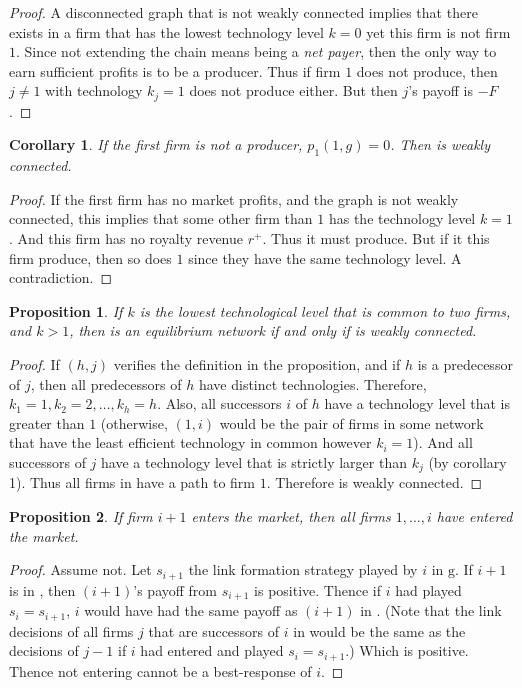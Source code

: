 \documentclass{article}
\newtheorem{corollary}{Corollary}
\newtheorem{proposition}{Proposition}
\begin{document}
\begin{proof}
A disconnected graph that is not weakly connected implies that there exists in  a firm that has the lowest technology level $k=0$ yet this firm is not firm $1$. Since not extending the chain means being a \textit{net payer}, then the only way to earn sufficient profits is to be a producer. Thus if firm $1$ does not produce, then $j\neq 1$ with technology $k_j=1$ does not produce either. But then $j$'s payoff is $-F$. 
\end{proof}

\begin{corollary}
If the first firm is not a producer, $p_1(1,g)=0$. Then  is weakly connected.
\end{corollary}

\begin{proof}
If the first firm has no market profits, and the graph is not weakly connected, this implies that some other firm than $1$ has the technology level $k=1$. And this firm has no royalty revenue $r^+$. Thus it must produce. But if it this firm produce, then so does $1$ since they have the same technology level. A contradiction.  
\end{proof}

\begin{proposition}
If $k$ is the lowest technological level that is common to two firms, and $k>1$, then  is an equilibrium network if and only if  is weakly connected. 
\end{proposition} 
\begin{proof}
If $(h,j)$ verifies the definition in the proposition, and if $h$ is a predecessor of $j$, then all predecessors of $h$ have distinct technologies. Therefore, $k_1=1, k_2=2,\ldots, k_h=h$. Also, all successors $i$ of $h$ have a technology level that is greater than $1$ (otherwise, $(1,i)$ would be the pair of firms in some network  that have the least efficient technology in common however $k_i=1$). And all successors of $j$ have a technology level that is strictly larger than $k_j$ (by corollary 1). Thus all firms in  have a path to firm $1$. Therefore  is weakly connected. 
\end{proof}

\begin{proposition}
If firm $i+1$ enters the market, then all firms $1,\ldots, i$ have entered the market.
\end{proposition}
\begin{proof}
Assume not. Let $s_{i+1}$ the link formation strategy played by $i$ in $\text{g}$. If $i+1$ is in , then $(i+1)$'s payoff from $s_{i+1}$ is positive. Thence if $i$ had played $s_{i}=s_{i+1}$, $i$ would have had the same payoff as $(i+1)$ in . (Note that the link decisions of all firms $j$ that are successors of $i$ in  would be the same as the decisions of $j-1$ if $i$ had entered and played $s_i=s_{i+1}$.) Which is positive. Thence not entering cannot be a best-response of $i$. 
\end{proof}
\end{document}
